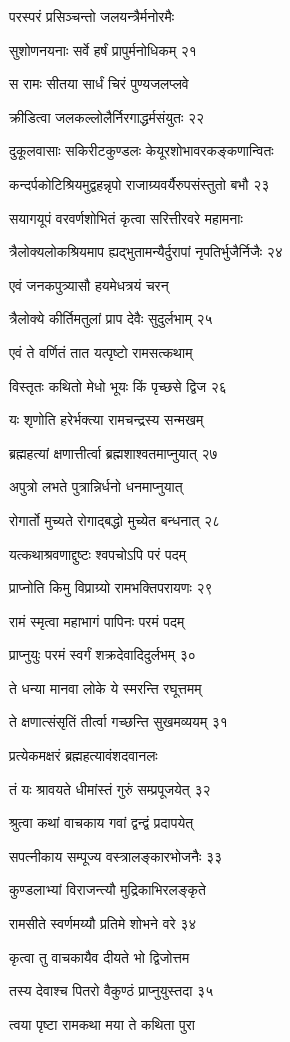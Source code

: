 परस्परं प्रसिञ्चन्तो जलयन्त्रैर्मनोरमैः

सुशोणनयनाः सर्वे हर्षं प्रापुर्मनोधिकम् २१

स रामः सीतया सार्धं चिरं पुण्यजलप्लवे

क्रीडित्वा जलकल्लोलैर्निरगाद्धर्मसंयुतः २२

दुकूलवासाः सकिरीटकुण्डलः केयूरशोभावरकङ्कणान्वितः

कन्दर्पकोटिश्रियमुद्वहन्नृपो राजाग्र्यवर्यैरुपसंस्तुतो बभौ २३

सयागयूपं वरवर्णशोभितं कृत्वा सरित्तीरवरे महामनाः

त्रैलोक्यलोकश्रियमाप ह्यद्भुतामन्यैर्दुरापां नृपतिर्भुजैर्निजैः २४

एवं जनकपुत्र्यासौ हयमेधत्रयं चरन्

त्रैलोक्ये कीर्तिमतुलां प्राप देवैः सुदुर्लभाम् २५

एवं ते वर्णितं तात यत्पृष्टो रामसत्कथाम्

विस्तृतः कथितो मेधो भूयः किं पृच्छसे द्विज २६

यः शृणोति हरेर्भक्त्या रामचन्द्रस्य सन्मखम्

ब्रह्महत्यां क्षणात्तीर्त्वा ब्रह्मशाश्वतमाप्नुयात् २७

अपुत्रो लभते पुत्रान्निर्धनो धनमाप्नुयात्

रोगार्तो मुच्यते रोगाद्बद्धो मुच्येत बन्धनात् २८

यत्कथाश्रवणाद्दुष्टः श्वपचोऽपि परं पदम्

प्राप्नोति किमु विप्राग्र्यो रामभक्तिपरायणः २९

रामं स्मृत्वा महाभागं पापिनः परमं पदम्

प्राप्नुयुः परमं स्वर्गं शक्रदेवादिदुर्लभम् ३०

ते धन्या मानवा लोके ये स्मरन्ति रघूत्तमम्

ते क्षणात्संसृतिं तीर्त्वा गच्छन्ति सुखमव्ययम् ३१

प्रत्येकमक्षरं ब्रह्महत्यावंशदवानलः

तं यः श्रावयते धीमांस्तं गुरुं सम्प्रपूजयेत् ३२

श्रुत्वा कथां वाचकाय गवां द्वन्द्वं प्रदापयेत्

सपत्नीकाय सम्पूज्य वस्त्रालङ्कारभोजनैः ३३

कुण्डलाभ्यां विराजन्त्यौ मुद्रिकाभिरलङ्कृते

रामसीते स्वर्णमय्यौ प्रतिमे शोभने वरे ३४

कृत्वा तु वाचकायैव दीयते भो द्विजोत्तम

तस्य देवाश्च पितरो वैकुण्ठं प्राप्नुयुस्तदा ३५

त्वया पृष्टा रामकथा मया ते कथिता पुरा


